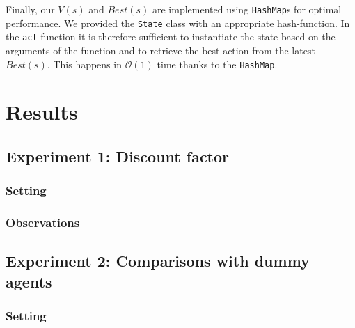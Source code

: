\documentclass[11pt]{article}
\begin{document}
Finally, our $V(s)$ and $Best(s)$ are implemented using \texttt{HashMap}s for 
optimal performance. We provided the \texttt{State} class with an appropriate 
hash-function. In the \texttt{act} function it is therefore sufficient to instantiate 
the state based on the arguments of the function and to retrieve the best action 
from the latest $Best(s)$. This happens in $\mathcal{O}(1)$ time thanks to the 
\texttt{HashMap}.


\section{Results}

\subsection{Experiment 1: Discount factor}

\subsubsection{Setting}

\subsubsection{Observations}

\subsection{Experiment 2: Comparisons with dummy agents}

\subsubsection{Setting}
\end{document}
